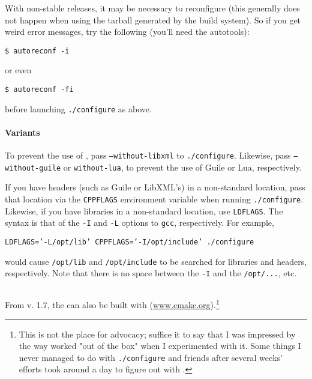 With non-stable releases, it may be necessary to reconfigure (this generally
does not happen when using the tarball generated by the build system). So if you
get weird error messages, try the following (you'll need the \gnu{} autotools):

\begin{verbatim}
$ autoreconf -i
\end{verbatim}

or even

\begin{verbatim}
$ autoreconf -fi
\end{verbatim}

before launching \texttt{./configure} as above.

\paragraph{Variants}

To prevent the use of \libxml, pass \texttt{--without-libxml} to
\texttt{./configure}. Likewise,  pass
\texttt{--without-guile} or \texttt{without-lua}, to prevent the use of Guile or
Lua, respectively. 

If you have headers (such as Guile or LibXML's) in a non-standard location, pass
that location via the \texttt{CPPFLAGS} environment variable when running
\texttt{./configure}. Likewise, if you have libraries in a non-standard
location, use \texttt{LDFLAGS}. The syntax is that of the \texttt{-I} and
\texttt{-L} options to \texttt{gcc}, respectively. For example,

\texttt{LDFLAGS='-L/opt/lib' CPPFLAGS='-I/opt/include' ./configure}

would cause \texttt{/opt/lib} and \texttt{/opt/include} to be searched for
libraries and headers, respectively. Note that there is no space between the
\texttt{-I} and the \texttt{/opt/...}, etc.

\subsection{\cmake{}}

From v. 1.7, the \nutils{} can also be built with \cmake{}
(\url{www.cmake.org}).\footnote{This is not the place for advocacy; suffice it
to say that I was impressed by the way \cmake{} worked "out of the box" when I
experimented with it. Some things I never managed to do with
\texttt{./configure} and friends after several weeks' efforts took around a day
to figure out with \cmake{}.} 

